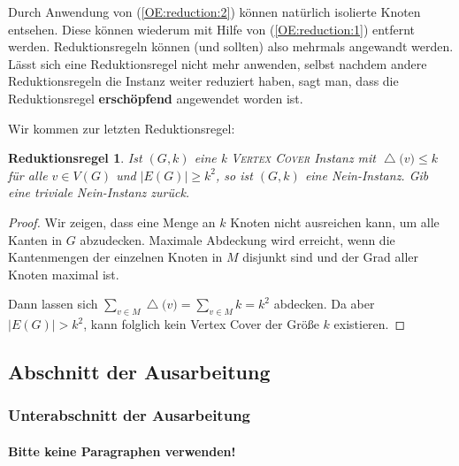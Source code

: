 \documentclass[a4paper,ngerman]{atseminar}
\renewcommand{\deg}[1]{\ensuremath{\operatorname{\triangle}\bigl(#1\bigr)}\xspace}
\newtheorem{reductionrule}[theorem]{\textbf{Reduktionsregel}}
\begin{document}
\begin{example}
    \noindent
    Durch Anwendung von (\ref{OE:reduction:2}) können natürlich isolierte Knoten entsehen. Diese können wiederum mit Hilfe von (\ref{OE:reduction:1}) entfernt
    werden.
    Reduktionsregeln können (und sollten) also mehrmals angewandt werden. Lässt sich eine Reduktionsregel nicht mehr anwenden, selbst nachdem andere Reduktionsregeln
    die Instanz weiter reduziert haben, sagt man, dass die Reduktionsregel \textbf{erschöpfend} angewendet worden ist.

    \noindent
    Wir kommen zur letzten Reduktionsregel:

    \begin{reductionrule}
      Ist $(G, k)$ eine k \textsc{Vertex Cover} Instanz mit $\deg{v} \leq k$ für alle $ v \in V(G)$ und $|E(G)| \geq k^2$, so ist $(G, k)$
      eine Nein-Instanz. Gib eine triviale Nein-Instanz zurück. 
    \end{reductionrule}
    \begin{proof}
      Wir zeigen, dass eine Menge an $k$ Knoten nicht ausreichen kann, um alle Kanten in $G$ abzudecken.
      \noindent
      Maximale Abdeckung wird erreicht, wenn die Kantenmengen der einzelnen Knoten in $M$ disjunkt sind und der Grad aller Knoten maximal ist.
      
      \noindent
      Dann lassen sich $\sum_{v \in M}{\deg{v}} = \sum_{v \in M}{k} = k^2$ abdecken.
      \noindent
      Da aber $|E(G)| > k^2$, kann folglich kein Vertex Cover der Größe $k$ existieren.
    \end{proof}
\end{example}






\subsection{Abschnitt der Ausarbeitung}

\subsubsection{Unterabschnitt der Ausarbeitung}


\paragraph{Bitte keine Paragraphen verwenden!}
\end{document}
